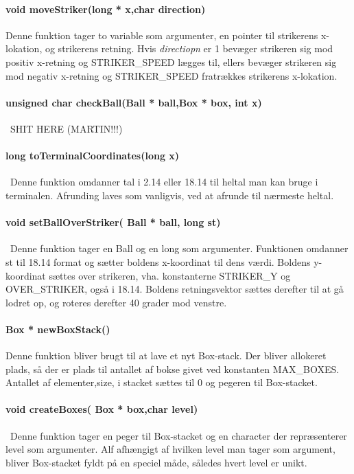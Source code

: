 \paragraph{void moveStriker(long * x,char direction)}
Denne funktion tager to variable som argumenter, en pointer til strikerens x-lokation, og  strikerens retning. Hvis \textit{directiopn} er 1 bevæger strikeren sig mod positiv x-retning og STRIKER\_SPEED lægges til, ellers bevæger strikeren sig mod negativ x-retning og STRIKER\_SPEED fratrækkes strikerens x-lokation.
\paragraph{unsigned char checkBall(Ball * ball,Box * box,  int x)}\
SHIT HERE (MARTIN!!!)
\paragraph{long toTerminalCoordinates(long x)}\
Denne funktion omdanner tal i 2.14 eller 18.14 til heltal man kan bruge i terminalen. Afrunding laves som vanligvis, ved at afrunde til nærmeste heltal.

\paragraph{void setBallOverStriker( Ball * ball, long st)}\
Denne funktion tager en Ball og en long som argumenter.
Funktionen omdanner st til 18.14 format og sætter boldens x-koordinat til dens værdi.
Boldens y-koordinat sættes over strikeren, vha. konstanterne STRIKER\_Y og OVER\_STRIKER, også i 18.14. Boldens retningsvektor sættes derefter til at gå lodret op, og roteres derefter 40 grader mod venstre.
\paragraph{Box * newBoxStack()}
Denne funktion bliver brugt til at lave et nyt Box-stack. Der bliver allokeret plads, så der er plads til antallet af bokse givet ved konstanten MAX\_BOXES. Antallet af elementer,size, i stacket sættes til 0 og  pegeren til Box-stacket.
\paragraph{
void createBoxes( Box * box,char level)}\
Denne funktion tager en peger til Box-stacket og en character der repræsenterer level som argumenter. Alf afhængigt af hvilken level man tager som argument, bliver Box-stacket fyldt på en speciel måde, således hvert level er unikt. 

